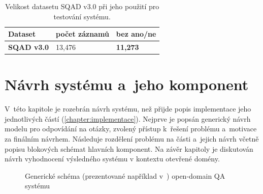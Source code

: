 \begin{table}[H]
\centering
\begin{tabular}{|l|l|l|}
\hline
Dataset            & počet záznamů & bez ano/ne      \\ \hline
\textbf{SQAD v3.0} & 13,476        & \textbf{11,273} \\ \hline
\end{tabular}
\caption{Velikost datasetu SQAD v3.0 při jeho použití pro testování systému.}
\label{tab:sqad_size}
\end{table}


\chapter{Návrh systému a~jeho komponent}
\label{chapter:design_}
V~této kapitole je rozebrán návrh systému, než přijde popis implementace jeho jednotlivých částí (\ref{chapter:implementace}). Nejprve je popsán generický návrh modelu pro odpovídání na otázky, zvolený přístup k~řešení problému a~motivace za finálním návrhem. Následuje rozdělení problému na části a~jejich návrh včetně popisu blokových schémat hlavních komponent. Na závěr kapitoly je diskutován návrh vyhodnocení výsledného systému v kontextu otevřené domény.

\begin{figure}[hbt]
	\centering
	\caption{Generické schéma (prezentované například v~\cite{drQA}) open-domain QA systému}
	\label{qa_scheme}
\end{figure}

